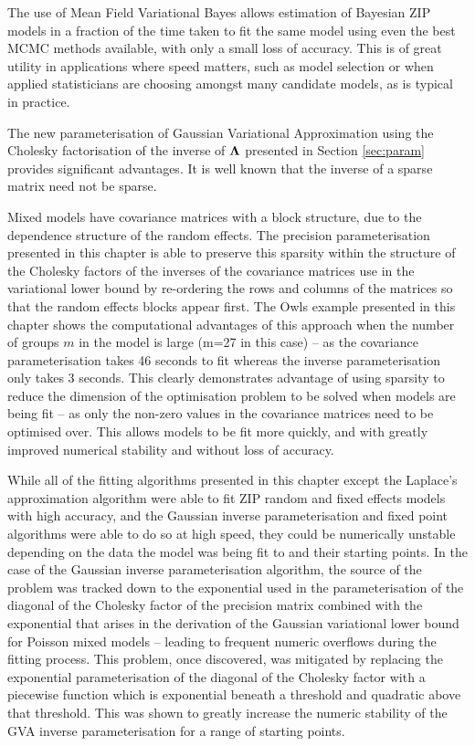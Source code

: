 			The use of Mean Field Variational Bayes allows estimation of Bayesian ZIP models in a fraction of the time taken to fit the same model using even the best MCMC methods available, with only a small loss of accuracy.
			This is of great utility in applications where speed matters, such as model selection or when applied
			statisticians are choosing amongst many candidate models, as is typical in practice.
					
			The new parameterisation of Gaussian Variational Approximation using the Cholesky factorisation of the inverse of ${\boldsymbol \Lambda}$ presented in Section \ref{sec:param} provides significant advantages.  It is well known that the inverse of a sparse matrix need not be sparse. 

			Mixed models have covariance matrices with a block structure, due to the dependence structure of the
			random effects. The precision parameterisation presented in this chapter is able to preserve this
			sparsity within the structure of the Cholesky factors of the inverses of the covariance matrices use in
			the variational lower bound by re-ordering the rows and columns of the matrices so that the random
			effects blocks appear first. The Owls example presented in this chapter shows the computational
			advantages of this approach when the number of groups $m$ in the model is large (m=27 in this case) --
			as the covariance parameterisation takes 46 seconds to fit whereas the inverse parameterisation only
			takes 3 seconds. This clearly demonstrates advantage of using sparsity to reduce the dimension of the
			optimisation problem to be solved when models are being fit -- as only the non-zero values in the
			covariance matrices need to be optimised over. This allows models to be fit more quickly, and with
			greatly improved numerical stability and without loss of accuracy.

			While all of the fitting algorithms presented in this chapter except the Laplace's approximation
			algorithm were able to fit ZIP random and fixed effects models with high accuracy, and the 
			Gaussian inverse parameterisation and fixed point algorithms were able to do so at high speed, they 
			could be numerically unstable depending on the data the model was being fit to and their starting points.
			In the case of the Gaussian inverse parameterisation algorithm, the source of the problem was tracked down
			to the exponential used in the parameterisation of the diagonal of the Cholesky factor of the precision
			matrix combined with the exponential that arises in the derivation of the Gaussian variational lower
			bound for Poisson mixed models -- leading to frequent numeric overflows during the fitting process. This
			problem, once discovered, was mitigated by replacing the exponential parameterisation of the diagonal
			of the Cholesky factor with a piecewise function which is exponential beneath a threshold and quadratic
			above that threshold. This was shown to greatly increase the numeric stability of the GVA inverse
			parameterisation for a range of starting points.

